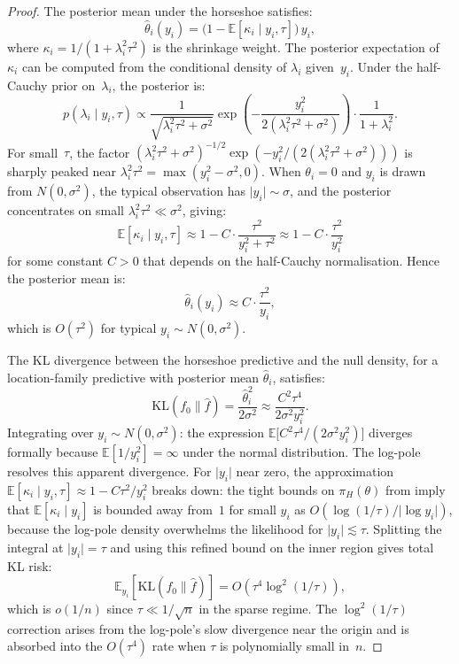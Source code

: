 \documentclass[12pt]{article}
\newcommand{\E}{\mathbb{E}}
\newcommand{\KL}{\mathrm{KL}}
\newcommand{\abs}[1]{\lvert #1 \rvert}
\newcommand{\piH}{\pi_H}
\begin{document}
\begin{proof}
The posterior mean under the horseshoe satisfies:
\begin{equation}\label{eq:post-mean}
  \hat{\theta}_i(y_i) = \bigl(1 - \E[\kappa_i \mid y_i, \tau]\bigr)\, y_i,
\end{equation}
where $\kappa_i = 1/(1 + \lambda_i^2 \tau^2)$ is the shrinkage weight. The posterior expectation of $\kappa_i$ can be computed from the conditional density of $\lambda_i$ given~$y_i$. Under the half-Cauchy prior on~$\lambda_i$, the posterior is:
\begin{equation}\label{eq:lambda-posterior}
  p(\lambda_i \mid y_i, \tau)
  \propto \frac{1}{\sqrt{\lambda_i^2\tau^2 + \sigma^2}}
  \exp\!\left(-\frac{y_i^2}{2(\lambda_i^2\tau^2 + \sigma^2)}\right)
  \cdot \frac{1}{1 + \lambda_i^2}.
\end{equation}
For small~$\tau$, the factor $(\lambda_i^2\tau^2 + \sigma^2)^{-1/2}\exp(-y_i^2/(2(\lambda_i^2\tau^2 + \sigma^2)))$ is sharply peaked near $\lambda_i^2\tau^2 = \max(y_i^2 - \sigma^2, 0)$. When $\theta_i = 0$ and $y_i$ is drawn from $N(0, \sigma^2)$, the typical observation has $\abs{y_i} \sim \sigma$, and the posterior concentrates on small $\lambda_i^2\tau^2 \ll \sigma^2$, giving:
\[
  \E[\kappa_i \mid y_i, \tau]
  \approx 1 - C \cdot \frac{\tau^2}{y_i^2 + \tau^2}
  \approx 1 - C \cdot \frac{\tau^2}{y_i^2}
\]
for some constant $C > 0$ that depends on the half-Cauchy normalisation. Hence the posterior mean is:
\[
  \hat{\theta}_i(y_i) \approx C \cdot \frac{\tau^2}{y_i},
\]
which is $O(\tau^2)$ for typical $y_i \sim N(0, \sigma^2)$.

The KL divergence between the horseshoe predictive and the null density, for a location-family predictive with posterior mean $\hat{\theta}_i$, satisfies:
\begin{equation}\label{eq:kl-location}
  \KL(f_0 \| \hat{f})
  = \frac{\hat{\theta}_i^2}{2\sigma^2}
  \approx \frac{C^2 \tau^4}{2\sigma^2 y_i^2}.
\end{equation}
Integrating over $y_i \sim N(0, \sigma^2)$: the expression $\E\bigl[C^2\tau^4/(2\sigma^2 y_i^2)\bigr]$ diverges formally because $\E[1/y_i^2] = \infty$ under the normal distribution. The log-pole resolves this apparent divergence. For $\abs{y_i}$ near zero, the approximation $\E[\kappa_i \mid y_i, \tau] \approx 1 - C\tau^2/y_i^2$ breaks down: the tight bounds on $\piH(\theta)$ from  imply that $\E[\kappa_i \mid y_i]$ is bounded away from~$1$ for small $y_i$ as $O(\log(1/\tau)/\abs{\log y_i})$, because the log-pole density overwhelms the likelihood for $\abs{y_i} \lesssim \tau$. Splitting the integral at $\abs{y_i} = \tau$ and using this refined bound on the inner region gives total KL risk:
\begin{equation}\label{eq:kl-refined}
  \E_{y_i}\!\left[\KL(f_0 \| \hat{f})\right]
  = O(\tau^4 \log^2(1/\tau)),
\end{equation}
which is $o(1/n)$ since $\tau \ll 1/\sqrt{n}$ in the sparse regime. The $\log^2(1/\tau)$ correction arises from the log-pole's slow divergence near the origin and is absorbed into the $O(\tau^4)$ rate when $\tau$ is polynomially small in~$n$.
\end{proof}
\end{document}
